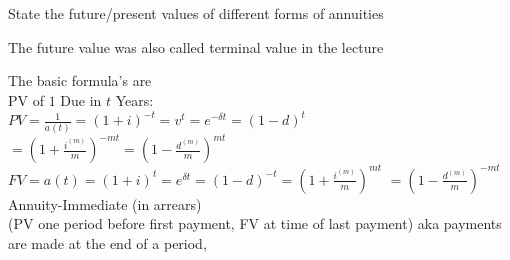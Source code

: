 \documentclass[11pt,a4paper,twoside]{article}
\begin{document}
State the future/present values of different forms of annuities

The future value was also called terminal value in the lecture

The basic formula's are \\
PV of $ 1 $ Due in $ t $ Years: \\
$ PV = \frac{1}{a(t)} = (1 + i)^{-t} = v^t = e^{-\delta t} = (1 - d)^t $
$ = \left( 1 + \frac{i^{(m)}}{m} \right)^{-mt} = \left( 1 - \frac{d^{(m)}}{m} \right)^{mt} $ \\
$ FV = a(t) = (1 + i)^t = e^{\delta t} = (1 - d)^{-t} = \left( 1 + \frac{i^{(m)}}{m} \right)^{mt}$
$= \left( 1 - \frac{d^{(m)}}{m} \right)^{-mt}$ \\

Annuity-Immediate (in arrears) \\
(PV one period before first payment, FV at time of last payment) aka payments are made at the end of a period, \\
\end{document}
